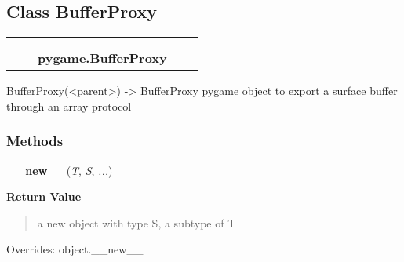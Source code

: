 

\subsection{Class BufferProxy}

    \label{pygame:BufferProxy}
\begin{tabular}{cccccc}
\multicolumn{2}{r}{\settowidth{\BCL}{object}\multirow{2}{\BCL}{object}}
&&
  \\\cline{3-3}
  &&\multicolumn{1}{c|}{}
&&
  \\
&&\multicolumn{2}{l}{\textbf{pygame.BufferProxy}}
\end{tabular}

BufferProxy({\textless}parent{\textgreater}) -{\textgreater} BufferProxy 
pygame object to export a surface buffer through an array protocol



  \subsubsection{Methods}

    \vspace{0.5ex}

\hspace{.8\funcindent}\begin{boxedminipage}{\funcwidth}

    \raggedright \textbf{\_\_new\_\_}(\textit{T}, \textit{S}, \textit{...})

\setlength{\parskip}{2ex}
\setlength{\parskip}{1ex}
      \textbf{Return Value}
    \vspace{-1ex}

      \begin{quote}
      a new object with type S, a subtype of T

      \end{quote}

      Overrides: object.\_\_new\_\_

    \end{boxedminipage}

